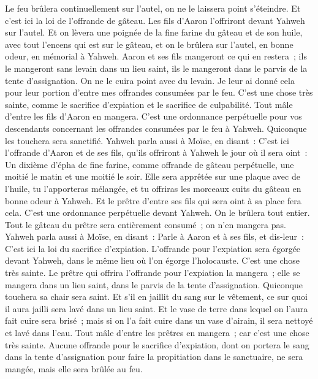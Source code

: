 \begin{multicols}{2}
Le feu brûlera continuellement sur l'autel, on ne le laissera point s'éteindre.
Et c'est ici la loi de l'offrande de gâteau. Les fils d'Aaron l'offriront devant Yahweh sur l'autel.
Et on lèvera une poignée de la fine farine du gâteau et de son huile, avec tout l'encens qui est sur le gâteau, et on le brûlera sur l'autel, en bonne odeur, en mémorial à Yahweh.
Aaron et ses fils mangeront ce qui en restera~; ils le mangeront sans levain dans un lieu saint, ils le mangeront dans le parvis de la tente d'assignation.
On ne le cuira point avec du levain. Je leur ai donné cela pour leur portion d'entre mes offrandes consumées par le feu. C'est une chose très sainte, comme le sacrifice d'expiation et le sacrifice de culpabilité.
Tout mâle d'entre les fils d'Aaron en mangera. C'est une ordonnance perpétuelle pour vos descendants concernant les offrandes consumées par le feu à Yahweh. Quiconque les touchera sera sanctifié.
Yahweh parla aussi à Moïse, en disant~:
C'est ici l'offrande d'Aaron et de ses fils, qu'ils offriront à Yahweh le jour où il sera oint~: Un dixième d'épha de fine farine, comme offrande de gâteau perpétuelle, une moitié le matin et une moitié le soir.
Elle sera apprêtée sur une plaque avec de l'huile, tu l'apporteras mélangée, et tu offriras les morceaux cuits du gâteau en bonne odeur à Yahweh.
Et le prêtre d'entre ses fils qui sera oint à sa place fera cela. C'est une ordonnance perpétuelle devant Yahweh. On le brûlera tout entier.
Tout le gâteau du prêtre sera entièrement consumé~; on n'en mangera pas.
Yahweh parla aussi à Moïse, en disant~:
Parle à Aaron et à ses fils, et dis-leur~: C'est ici la loi du sacrifice d'expiation. L'offrande pour l'expiation sera égorgée devant Yahweh, dans le même lieu où l'on égorge l'holocauste. C'est une chose très sainte.
Le prêtre qui offrira l'offrande pour l'expiation la mangera~; elle se mangera dans un lieu saint, dans le parvis de la tente d'assignation.
Quiconque touchera sa chair sera saint. Et s'il en jaillit du sang sur le vêtement, ce sur quoi il aura jailli sera lavé dans un lieu saint.
Et le vase de terre dans lequel on l'aura fait cuire sera brisé~; mais si on l'a fait cuire dans un vase d'airain, il sera nettoyé et lavé dans l'eau.
Tout mâle d'entre les prêtres en mangera~; car c'est une chose très sainte.
Aucune offrande pour le sacrifice d'expiation, dont on portera le sang dans la tente d'assignation pour faire la propitiation dans le sanctuaire, ne sera mangée, mais elle sera brûlée au feu.

\end{multicols}
